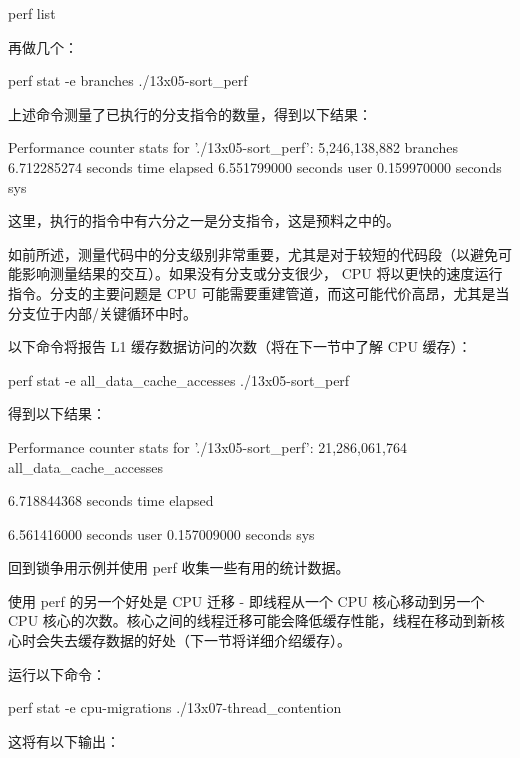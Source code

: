 \begin{shell}
perf list
\end{shell}

再做几个：

\begin{shell}
perf stat -e branches ./13x05-sort_perf
\end{shell}

上述命令测量了已执行的分支指令的数量，得到以下结果：

\begin{shell}
Performance counter stats for './13x05-sort_perf':
    5,246,138,882      branches
     6.712285274 seconds time elapsed
     6.551799000 seconds user
     0.159970000 seconds sys
\end{shell}

这里，执行的指令中有六分之一是分支指令，这是预料之中的。

如前所述，测量代码中的分支级别非常重要，尤其是对于较短的代码段（以避免可能影响测量结果的交互）。如果没有分支或分支很少， CPU 将以更快的速度运行指令。分支的主要问题是 CPU 可能需要重建管道，而这可能代价高昂，尤其是当分支位于内部/关键循环中时。

以下命令将报告 L1 缓存数据访问的次数（将在下一节中了解 CPU 缓存）：

\begin{shell}
perf stat -e all_data_cache_accesses ./13x05-sort_perf
\end{shell}

得到以下结果：

\begin{shell}
Performance counter stats for './13x05-sort_perf':
    21,286,061,764      all_data_cache_accesses

       6.718844368 seconds time elapsed

       6.561416000 seconds user
       0.157009000 seconds sys
\end{shell}

回到锁争用示例并使用 perf 收集一些有用的统计数据。

使用 perf 的另一个好处是 CPU 迁移 - 即线程从一个 CPU 核心移动到另一个 CPU 核心的次数。核心之间的线程迁移可能会降低缓存性能，线程在移动到新核心时会失去缓存数据的好处（下一节将详细介绍缓存）。

运行以下命令：

\begin{shell}
perf stat -e cpu-migrations ./13x07-thread_contention
\end{shell}

这将有以下输出：

